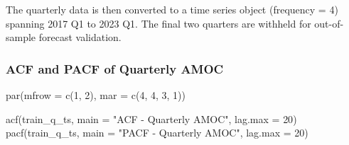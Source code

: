 \documentclass[
  11pt,
]{article}
\newenvironment{Shaded}{\begin{snugshade}}{\end{snugshade}}
\newcommand{\AttributeTok}[1]{\textcolor[rgb]{0.40,0.45,0.13}{#1}}
\newcommand{\CommentTok}[1]{\textcolor[rgb]{0.37,0.37,0.37}{#1}}
\newcommand{\DecValTok}[1]{\textcolor[rgb]{0.68,0.00,0.00}{#1}}
\newcommand{\FunctionTok}[1]{\textcolor[rgb]{0.28,0.35,0.67}{#1}}
\newcommand{\NormalTok}[1]{\textcolor[rgb]{0.00,0.23,0.31}{#1}}
\newcommand{\OtherTok}[1]{\textcolor[rgb]{0.00,0.23,0.31}{#1}}
\newcommand{\SpecialCharTok}[1]{\textcolor[rgb]{0.37,0.37,0.37}{#1}}
\newcommand{\StringTok}[1]{\textcolor[rgb]{0.13,0.47,0.30}{#1}}
\begin{document}
The quarterly data is then converted to a time series object (frequency
= 4) spanning 2017 Q1 to 2023 Q1. The final two quarters are withheld
for out-of-sample forecast validation.

\begin{Shaded}
\end{Shaded}

\subsubsection{ACF and PACF of Quarterly
AMOC}\label{acf-and-pacf-of-quarterly-amoc}

\begin{Shaded}
\begin{Highlighting}[]
\FunctionTok{par}\NormalTok{(}\AttributeTok{mfrow =} \FunctionTok{c}\NormalTok{(}\DecValTok{1}\NormalTok{, }\DecValTok{2}\NormalTok{), }\AttributeTok{mar =} \FunctionTok{c}\NormalTok{(}\DecValTok{4}\NormalTok{, }\DecValTok{4}\NormalTok{, }\DecValTok{3}\NormalTok{, }\DecValTok{1}\NormalTok{))}

\FunctionTok{acf}\NormalTok{(train\_q\_ts, }\AttributeTok{main =} \StringTok{"ACF {-} Quarterly AMOC"}\NormalTok{, }\AttributeTok{lag.max =} \DecValTok{20}\NormalTok{)}
\FunctionTok{pacf}\NormalTok{(train\_q\_ts, }\AttributeTok{main =} \StringTok{"PACF {-} Quarterly AMOC"}\NormalTok{, }\AttributeTok{lag.max =} \DecValTok{20}\NormalTok{)}
\end{Highlighting}
\end{Shaded}
\end{document}
